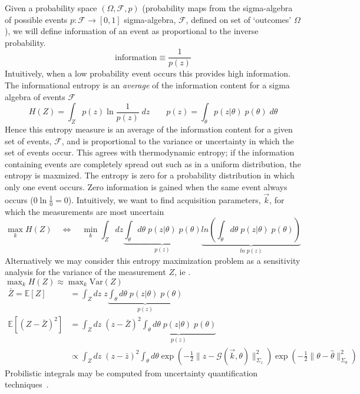 \documentclass{article}         %
\theoremstyle{definition}
\theoremstyle{remark}
\begin{document}
\begin{enumerate}
Given a probability space 
$(\Omega, \mathcal{F},p)$ (probability maps from the
sigma-algebra of possible events $p:\mathcal{F}\rightarrow [0,1]$
sigma-algebra, $\mathcal{F}$, defined on set of `outcomes' $\Omega$
\cite{durrett2010probability}),
we will define information of an event  as
proportional to the inverse probability.
\[
\text{information} \equiv  \frac{1}{p(z)}
\]
Intuitively, when a low probability event occurs this provides high
information.
The informational entropy is an \textit{average}
of the information content for a sigma algebra of events $\mathcal{F}$
\[
H(Z) = \int_Z  p(z) \ln\frac{1}{p(z)} \; dz
\qquad
  p(z) = \int_\theta p(z|\theta) \; p(\theta)\; d\theta 
\]
Hence this entropy measure is an average of the information content
for a given set of events, $\mathcal{F}$, and is proportional to the
variance or uncertainty in which the set of events occur.
This agrees with thermodynamic entropy;
if the information containing events are completely spread out such as in a
uniform distribution, the entropy is maxmized.
The entropy
is zero for a probability distribution in which
only one event occurs. Zero information is gained when the same event
always occurs ($0 \ln\frac{1}{0} = 0$). 
Intuitively, we want to find acquisition parameters,
$\vec{k}$, for which the measurements are most uncertain
\[
\max_k H(Z)
  \quad \Leftrightarrow \quad
\min_k 
    \int_Z   dz \underbrace{\int_\theta  d\theta \; p(z|\theta) \; p(\theta)}_{p(z)}
                \underbrace{ln \left(\int_\theta  d\theta \; p(z|\theta) \; p(\theta)\right)}_{ln \; p(z)}
\]
Alternatively we may consider this entropy maximization problem as a
sensitivity analysis for the variance of the measurement $Z$, ie . 
$ \max_k H(Z) \approx  \max_k \text{Var}(Z) $
\[ \begin{split}
   \bar{Z} = \mathbb{E}[Z]  & = \int_Z   dz \; z
   \underbrace{\int_\theta  d\theta \; p(z|\theta) \; p(\theta)}_{p(z)}
  \\
   \mathbb{E}[ ( Z - \bar{Z} )^2 ]  & = \int_Z   dz \;(z - \bar{Z})^2 
   \underbrace{\int_\theta  d\theta \; p(z|\theta) \; p(\theta)}_{p(z)}
  \\
   &  \propto
    \int_Z   dz \;(z - \bar{z})^2 \int_\theta  d\theta 
 \exp\left( - \frac{1}{2} \|  z- \mathcal{G}(\vec{k},\theta)  \|^2_{\Sigma_z}\right)
 \exp\left( - \frac{1}{2} \|  \theta - \hat{\theta}  \|^2_{\Sigma_\theta}\right)
 \end{split}
\]
Probilistic integrals may be
computed from uncertainty quantification
techniques~\cite{fahrenholtz2013generalised}.

 

\end{enumerate}

\nocite{*}


\end{document}
